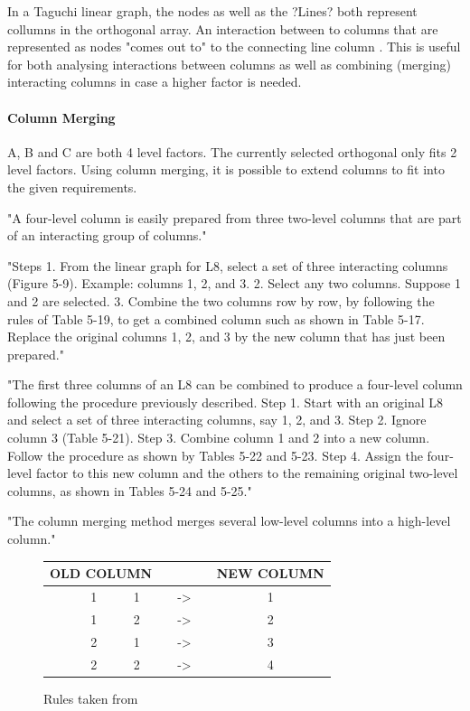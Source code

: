 In a Taguchi linear graph, the nodes as well as the ?Lines? both represent collumns in the orthogonal array. An interaction between to columns that are represented as nodes "comes out to" to the connecting line column \cite{taguchi_taguchis_2005}. This is useful for both analysing interactions between columns as well as combining (merging) interacting columns in case a higher factor is needed.

\paragraph{Column Merging}
A, B and C are both 4 level factors. The currently selected orthogonal only fits 2 level factors. Using column merging, it is possible to extend columns to fit into the given requirements.

"A four-level column is easily prepared from three two-level columns that are part of an interacting group of columns."\cite{roy_primer_1990}

"Steps 1. From the linear graph for L8, select a set of three interacting columns (Figure 5-9). Example: columns 1, 2, and 3. 2. Select any two columns. Suppose 1 and 2 are selected. 3. Combine the two columns row by row, by following the rules of Table 5-19, to get a combined column such as shown in Table 5-17. Replace the original columns 1, 2, and 3 by the new column that has just been prepared."\cite{roy_primer_1990}

"The first three columns of an L8 can be combined to produce a four-level column following the procedure previously described. Step 1. Start with an original L8 and select a set of three interacting columns, say 1, 2, and 3. Step 2. Ignore column 3 (Table 5-21). Step 3. Combine column 1 and 2 into a new column. Follow the procedure as shown by Tables 5-22 and 5-23. Step 4. Assign the four-level factor to this new column and the others to the remaining original two-level columns, as shown in Tables 5-24 and 5-25."\cite{roy_primer_1990}


"The column merging method merges several low-level columns into a high-level column."\cite{yang_design_2009}


\begin{figure}[H]
	\centering
	\begin{tabular}{ |ccccccc|  }
		\hline
		\multicolumn{3}{|c}{ OLD COLUMN } & & & & NEW COLUMN \\
		\hline
		& 1 & 1 & & -> & & 1\\
		& 1 & 2 & & -> & & 2\\
		& 2 & 1 & & -> & & 3\\
		& 2 & 2 & & -> & & 4\\
		\hline
	\end{tabular}
	\caption{Rules taken from \cite{roy_primer_1990}}
	\label{table:hyperparameter_tuning:merging_rules}
\end{figure}

